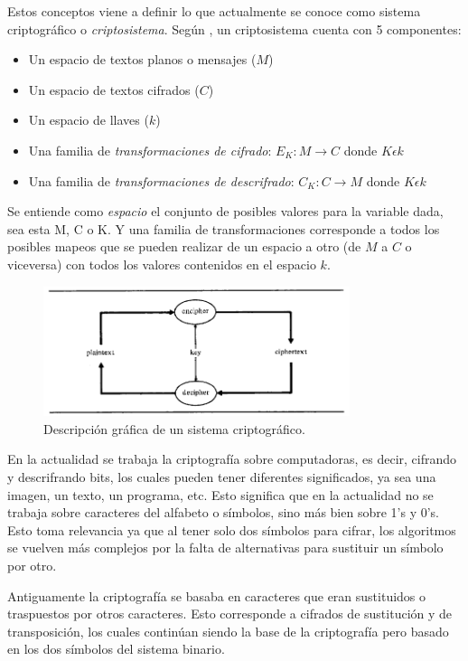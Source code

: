 Estos conceptos viene a definir lo que actualmente se conoce como sistema criptográfico o \textit{criptosistema}. Según \cite{denning}, un criptosistema cuenta con 5 componentes:
\begin{itemize}
\item Un espacio de textos planos o mensajes ($M$)
\item Un espacio de textos cifrados ($C$)
\item Un espacio de llaves ($k$)
\item Una familia de \textit{transformaciones de cifrado}: $E_K: M\rightarrow C$ donde $K \epsilon  k$
\item Una familia de \textit{transformaciones de descrifrado}: $C_K: C\rightarrow M$ donde $K \epsilon  k$
\end{itemize} 


Se entiende como \textit{espacio} el conjunto de posibles valores para la variable dada, sea esta M, C o K.
Y una familia de transformaciones corresponde a todos los posibles mapeos que se pueden realizar de un espacio a otro (de $M$ a $C$ o viceversa) con todos los valores contenidos en el espacio $k$.

\begin{figure}
	\centering
	\includegraphics[width=0.8\textwidth]{./images/figExplicacionSistemaCripto}
	\caption{Descripción gráfica de un sistema criptográfico.}
	\label{figExplicacionSistemaCripto}
\end{figure}


En la actualidad se trabaja la criptografía sobre computadoras, es decir, cifrando y descrifrando bits, los cuales pueden tener diferentes significados, ya sea una imagen, un texto, un programa, etc. Esto significa que en la actualidad no se trabaja sobre caracteres del alfabeto o símbolos, sino más bien sobre 1's y 0's. Esto toma relevancia ya que al tener solo dos símbolos para cifrar, los algoritmos se vuelven más complejos por la falta de alternativas para sustituir un símbolo por otro.

Antiguamente la criptografía se basaba en caracteres que eran sustituidos o traspuestos por otros caracteres. Esto corresponde a cifrados de sustitución y de transposición, los cuales continúan siendo la base de la criptografía pero basado en los dos símbolos del sistema binario.

